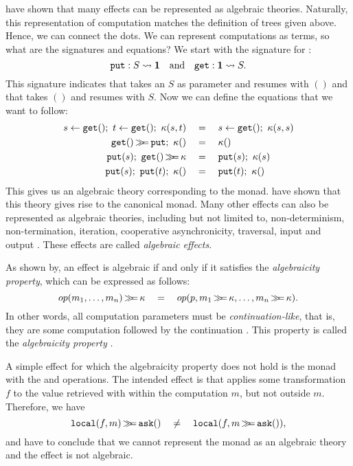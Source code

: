\textcite{goos_adequacy_2001} have shown that many effects can be represented as algebraic theories.
Naturally, this representation of computation matches the definition of trees given above. Hence, we can connect the dots. We can represent computations as terms, so what are the signatures and equations? We start with the signature for :
\[
    \mathtt{put} : S \rightsquigarrow \mathbf{1}
    \quad\text{and}\quad
    \mathtt{get} : \mathbf{1} \rightsquigarrow S.
\]
This signature indicates that \oput takes an $S$ as parameter and resumes with $()$ and that \oget takes $()$ and resumes with $S$. Now we can define the equations that we want  to follow:
\begin{align*}
    s \gets \mathtt{get}() ;\  t \gets \mathtt{get}() ;\  \kappa(s,t)
        &\quad=\quad s \gets \mathtt{get}();\  \kappa(s, s) \\
    \mathtt{get}()\operatorname{\mathtt{\gg\!\!=}} \mathtt{put};\  \kappa() &\quad=\quad \kappa () \\
    \mathtt{put}(s);\  \mathtt{get}()\operatorname{\mathtt{\gg\!\!=}} \kappa &\quad=\quad \mathtt{put}(s);\  \kappa(s) \\
    \mathtt{put}(s);\  \mathtt{put}(t);\  \kappa() &\quad=\quad \mathtt{put}(t);\  \kappa()
\end{align*}
This gives us an algebraic theory corresponding to the  monad. \textcite{goos_adequacy_2001} have shown that this theory gives rise to the canonical  monad. Many other effects can also be represented as algebraic theories, including but not limited to, non-determinism, non-termination, iteration, cooperative asynchronicity, traversal, input and output \citationneeded{}. These effects are called \emph{algebraic effects}.

As shown by\textcite{plotkin_algebraic_2003},  an effect is algebraic if and only if it satisfies the \emph{algebraicity property}, which can be expressed as follows:
\[
    op(m_1, \dots, m_n) \operatorname{\mathtt{\gg\!\!=}} \kappa \quad=\quad op(p, m_1\operatorname{\mathtt{\gg\!\!=}} \kappa, \dots, m_n\operatorname{\mathtt{\gg\!\!=}}\kappa).
\]
In other words, all computation parameters must be \emph{continuation-like}, that is, they are some computation followed by the continuation \autocite{bach_poulsen_hefty_2023}. This property is called the \emph{algebraicity property} \autocite{plotkin_algebraic_2003}.

A simple effect for which the algebraicity property does not hold is the  monad with the \olocal and \oask operations. The intended effect is that \olocal applies some transformation $f$ to the value retrieved with \oask within the computation $m$, but not outside $m$. Therefore, we have
\[
    \mathtt{local}(f, m) \operatorname{\mathtt{\gg\!\!=}} \mathtt{ask}() \quad\neq\quad \mathtt{local}(f, m \operatorname{\mathtt{\gg\!\!=}} \mathtt{ask}()),
\]
and have to conclude that we cannot represent the  monad as an algebraic theory and the effect is not algebraic.

